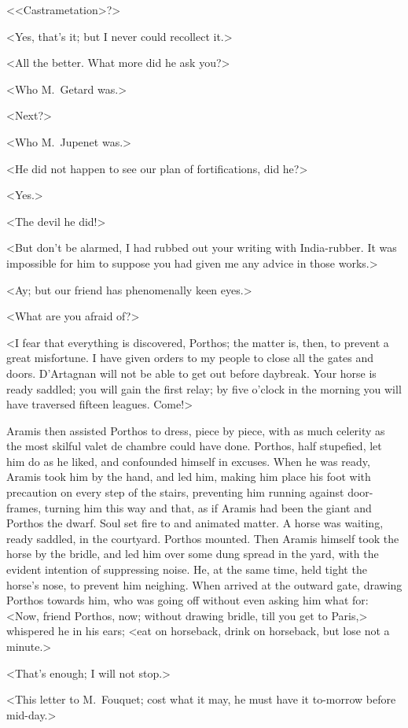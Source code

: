 <<Castrametation>?>

<Yes, that's it; but I never could recollect it.>

<All the better. What more did he ask you?>

<Who M.~Getard was.>

<Next?>

<Who M.~Jupenet was.>

<He did not happen to see our plan of fortifications, did he?>

<Yes.>

<The devil he did!>

<But don't be alarmed, I had rubbed out your writing with India-rubber. It was impossible for him to suppose you had given me any advice in those works.>

<Ay; but our friend has phenomenally keen eyes.>

<What are you afraid of?>

<I fear that everything is discovered, Porthos; the matter is, then, to prevent a great misfortune. I have given orders to my people to close all the gates and doors. D'Artagnan will not be able to get out before daybreak. Your horse is ready saddled; you will gain the first relay; by five o'clock in the morning you will have traversed fifteen leagues. Come!>

Aramis then assisted Porthos to dress, piece by piece, with as much celerity as the most skilful valet de chambre could have done. Porthos, half stupefied, let him do as he liked, and confounded himself in excuses. When he was ready, Aramis took him by the hand, and led him, making him place his foot with precaution on every step of the stairs, preventing him running against door-frames, turning him this way and that, as if Aramis had been the giant and Porthos the dwarf. Soul set fire to and animated matter. A horse was waiting, ready saddled, in the courtyard. Porthos mounted. Then Aramis himself took the horse by the bridle, and led him over some dung spread in the yard, with the evident intention of suppressing noise. He, at the same time, held tight the horse's nose, to prevent him neighing. When arrived at the outward gate, drawing Porthos towards him, who was going off without even asking him what for: <Now, friend Porthos, now; without drawing bridle, till you get to Paris,> whispered he in his ears; <eat on horseback, drink on horseback, but lose not a minute.>

<That's enough; I will not stop.>

<This letter to M.~Fouquet; cost what it may, he must have it to-morrow before mid-day.>

